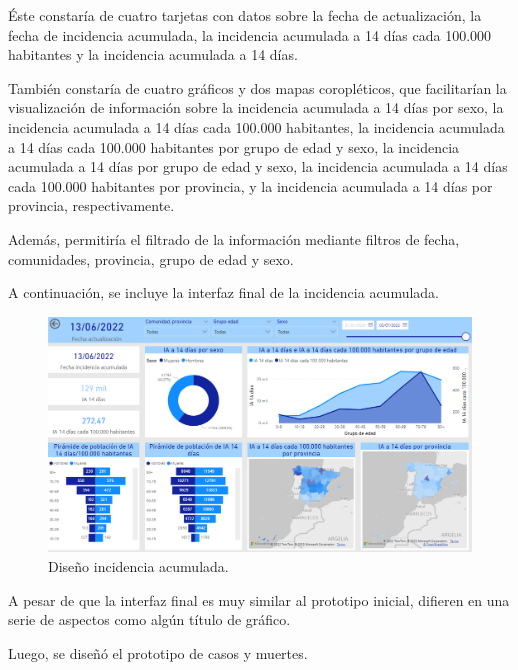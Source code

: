 Éste constaría de cuatro tarjetas con datos sobre la fecha de actualización, la fecha de incidencia acumulada, la incidencia acumulada a 14 días cada 100.000 habitantes y la incidencia acumulada a 14 días. 

También constaría de cuatro gráficos y dos mapas  coropléticos, que facilitarían la visualización de información sobre la incidencia acumulada a 14 días por sexo, la incidencia acumulada a 14 días cada 100.000 habitantes, la incidencia acumulada a 14 días cada 100.000 habitantes por grupo de edad y sexo, la incidencia acumulada a 14 días por grupo de edad y sexo, la incidencia acumulada a 14 días cada 100.000 habitantes por provincia, y la incidencia acumulada a 14 días por provincia, respectivamente.

Además, permitiría el filtrado de la información mediante filtros de fecha, comunidades, provincia, grupo de edad y sexo.

\newpage
A continuación, se incluye la interfaz final de la incidencia acumulada. 

\begin{figure}[h]
    \advance\leftskip-0.5cm 
    \includegraphics[scale=0.55]{img/powerBI_IA.PNG}
    \caption{Diseño incidencia acumulada.}
\end{figure}

A pesar de que la interfaz final es muy similar al prototipo inicial, difieren en una serie de aspectos como algún título de gráfico.

\newpage
Luego, se diseñó el prototipo de casos y muertes. 

